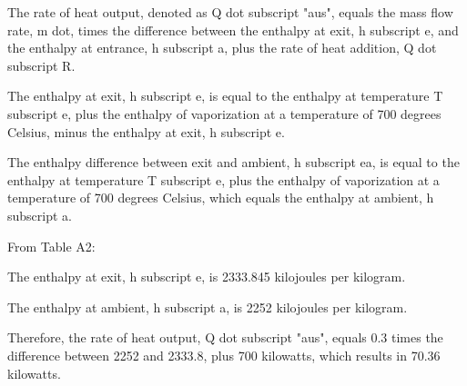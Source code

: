 The rate of heat output, denoted as Q dot subscript "aus", equals the mass flow rate, m dot, times the difference between the enthalpy at exit, h subscript e, and the enthalpy at entrance, h subscript a, plus the rate of heat addition, Q dot subscript R.

The enthalpy at exit, h subscript e, is equal to the enthalpy at temperature T subscript e, plus the enthalpy of vaporization at a temperature of 700 degrees Celsius, minus the enthalpy at exit, h subscript e.

The enthalpy difference between exit and ambient, h subscript ea, is equal to the enthalpy at temperature T subscript e, plus the enthalpy of vaporization at a temperature of 700 degrees Celsius, which equals the enthalpy at ambient, h subscript a.

From Table A2:

The enthalpy at exit, h subscript e, is 2333.845 kilojoules per kilogram.

The enthalpy at ambient, h subscript a, is 2252 kilojoules per kilogram.

Therefore, the rate of heat output, Q dot subscript "aus", equals 0.3 times the difference between 2252 and 2333.8, plus 700 kilowatts, which results in 70.36 kilowatts.